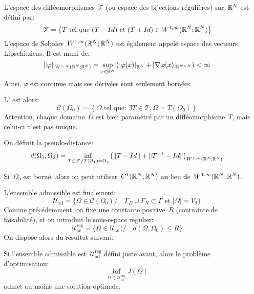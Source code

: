 \medskip
\begin{definition}
L'espace des difféomorphismes~$\mathscr{T}$ (ou espace des bijections régulières) sur~$\mathbb R^N$ est défini par:
\begin{equation}
\mathscr{T}=\left\{ T \text{ tel que } (T-Id) \text{ et } (T+Id)\in W^{1,\infty}(\mathbb R^N;\mathbb R^N)\right\}
\end{equation}
L'espace de Sobolev~$W^{1,\infty}(\mathbb R^N;\mathbb R^N)$ est également appelé espace des vecteurs Lipschitziens. Il est muni de:
\begin{equation}
\|\varphi\|_{W^{1,\infty}(\mathbb R^N;\mathbb R^N)}=\sup_{x\in\mathbb R^N} \left(|\varphi(x)|_{\mathbb R^N}
+|\nabla\varphi(x)|_{\mathbb R^{N\times N}}\right) <\infty
\end{equation}
Ainsi, $\varphi$ est continue mais ses dérivées sont seulement bornées.
\end{definition}

L' est alors:
\begin{equation}
\mathcal{C}(\Omega_0)=\left\{ \Omega \text{ tel que: } \exists T\in\mathscr{T}, \Omega=T(\Omega_0) \right\}
\end{equation}
Attention, chaque domaine~$\Omega$ est bien paramétré par un difféomorphisme~$T$, mais celui-ci n'est pas unique.

On définit la pseudo-distance:
\begin{equation}
d(\Omega_1,\Omega_2) = \inf_{T\in\mathscr{T}/ T(\Omega_1)=\Omega_2}
\left( \|T-Id\|+\|T^{-1}-Id\|\right)_{W^{1,\infty}(\mathbb R^N;\mathbb R^N)}
\end{equation}

Si~$\Omega_0$ est borné, alors on peut utiliser~$C^1(\mathbb R^N;\mathbb R^N)$ au lieu de~$W^{1,\infty}(\mathbb R^N;\mathbb R^N)$.

\medskip
L'ensemble admissible est finalement:
\begin{equation}
\mathscr{U}_{\text{ad}} = \{ \Omega\in\mathcal{C}(\Omega_0) / \quad
\Gamma_D \cup \Gamma_N \subset \Gamma \text{ et } |\Omega|=V_0 \}
\end{equation}
Comme précédemment, on fixe une constante positive~$R$ (contrainte de faisabilité), et on introduit le sous-espace régulier:
\begin{equation}
\mathscr{U}_{\text{ad}}^{\text{reg}} = \{ \Omega\in\mathscr{U}_{\text{ad}}) / \quad
d(\Omega,\Omega_0)\le R \}
\end{equation}
On dispose alors du résultat suivant:
\begin{theoreme}
Si l'ensemble admissible est~$\mathscr{U}_{\text{ad}}^{\text{reg}}$ défini juste avant, alors le problème d'optimisation:
\[ \inf_{\Omega\in\mathscr{U}_{\text{ad}}^{\text{reg}}} J(\Omega) \]
admet au moins une solution optimale.
\end{theoreme}

